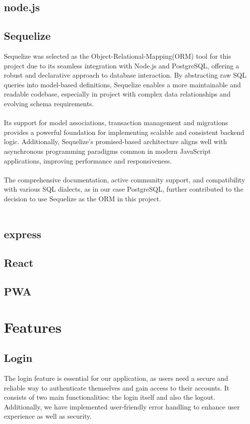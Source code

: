 \documentclass[a4paper,12pt]{report}
\begin{document}
\section{node.js}
\section{Sequelize}
Sequelize was selected as the Object-Relational-Mapping(ORM) tool for this project due to its seamless integration with Node.js and PostgreSQL, offering a robust and declarative approach to database interaction. By abstracting raw SQL queries into model-based definitions, Sequelize enables a more maintainable and readable codebase, especially in project with complex data relationships and evolving schema requirements.\\\\
Its support for model associations, transaction management and migrations provides a powerful foundation for implementing scalable and consistent backend logic. Additionally, Sequelize's promised-based architecture aligns well with asynchronous programming paradigms common in modern JavaScript applications, improving performance and responsiveness.\parencite{sequelizegit}\\\\
The comprehensive documentation, active community support, and compatibility with various SQL dialects, as in our case PostgreSQL, further contributed to the decision to use Sequelize as the ORM in this project.\\\\
\section{express}
\section{React}
\section{PWA}
\chapter{Features}

\section{Login}
The login feature is essential for our application, as users need a secure and reliable way to authenticate themselves and gain access to their accounts. It consists of two main functionalities: the login itself and also the logout. Additionally, we have implemented user-friendly error handling to enhance user experience as well as security.
\end{document}
